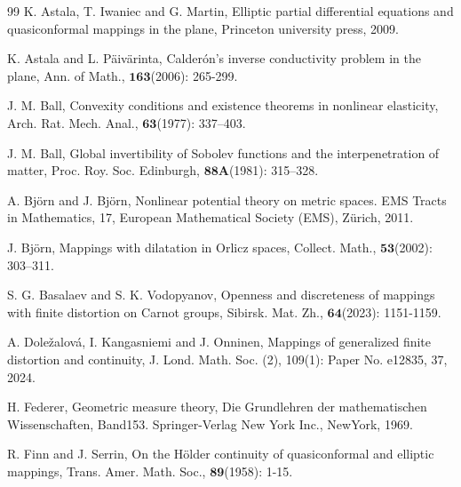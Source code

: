 \documentclass[11pt,twoside]{article}
\theoremstyle{definition}
\theoremstyle{remark}
\begin{document}
\begin{thebibliography}{99}
\balance
{}
K. Astala, T. Iwaniec and G. Martin, Elliptic partial differential equations and quasiconformal mappings in the plane, Princeton university press, 2009.


K. Astala and L. P\"{a}iv\"{a}rinta, Calder\'{o}n's inverse conductivity problem in the plane, Ann. of Math., $\mathbf{163}$(2006): 265-299.






 J. M. Ball, Convexity conditions and existence theorems in nonlinear elasticity, Arch. Rat. Mech. Anal., $\mathbf{63}$(1977): 337–403.


 J. M. Ball, Global invertibility of Sobolev functions and the interpenetration of matter, Proc. Roy. Soc. Edinburgh, $\mathbf{88A}$(1981): 315–328.

A. Bj\"{o}rn and J. Bj\"{o}rn, Nonlinear potential theory on metric spaces. EMS Tracts in Mathematics, 17, European Mathematical Society (EMS), Zürich, 2011. 


J. Bj\"{o}rn, Mappings with dilatation in Orlicz spaces, Collect. Math., $\mathbf{53}$(2002): 303–311.

S. G. Basalaev and S. K. Vodopyanov, Openness and discreteness of mappings with finite distortion on Carnot groups, Sibirsk. Mat. Zh., $\mathbf{64}$(2023): 1151-1159.














A. Dole\v{z}alov\'{a}, I. Kangasniemi and  J. Onninen, Mappings of generalized finite distortion and continuity, J. Lond. Math. Soc. (2), 109(1): Paper No. e12835, 37, 2024.










 H. Federer, Geometric measure theory, Die Grundlehren der mathematischen Wissenschaften, Band153. Springer-Verlag New York Inc., NewYork, 1969.




R. Finn and J. Serrin,  On the H\"{o}lder continuity of quasiconformal and elliptic mappings, Trans. Amer. Math. Soc., $\mathbf{89}$(1958): 1-15.











\end{thebibliography}
\end{document}
